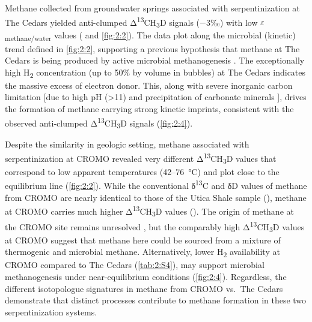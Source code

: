 Methane collected from groundwater springs associated with
serpentinization at The Cedars yielded anti-clumped
Δ\textsuperscript{13}CH\textsubscript{3}D signals ($-$3‰) with low
$\varepsilon$\textsubscript{methane/water} values ( and \ref{fig:2:2}). The data plot
along the microbial (kinetic) trend defined in \autoref{fig:2:2}, supporting a
previous hypothesis that methane at The Cedars is being produced by
active microbial methanogenesis \parencite{Morrill++_2013_GCA}. The exceptionally high
H\textsubscript{2} concentration (up to 50\% by volume in bubbles) at The Cedars indicates the
massive excess of electron donor. This, along with severe inorganic
carbon limitation {[}due to high pH (\textgreater{}11) and precipitation
of carbonate minerals \parencite{Morrill++_2013_GCA}{]}, drives the formation of methane
carrying strong kinetic imprints, consistent with the observed
anti-clumped Δ\textsuperscript{13}CH\textsubscript{3}D signals (\autoref{fig:2:4}).








Despite the similarity in geologic setting, methane associated with
serpentinization at CROMO \parencite{Cardace++_2013_SD} revealed very different
Δ\textsuperscript{13}CH\textsubscript{3}D values that correspond to
low apparent temperatures (42--76~°C) and plot close to the equilibrium
line (\autoref{fig:2:2}). While the conventional δ\textsuperscript{13}C and δD
values of methane from CROMO are nearly identical to those of the Utica
Shale sample (), methane at CROMO carries much higher
Δ\textsuperscript{13}CH\textsubscript{3}D values (). The origin
of methane at the CROMO site remains unresolved \parencite{Cardace++_2013_SD}, but the
comparably high Δ\textsuperscript{13}CH\textsubscript{3}D values at
CROMO suggest that methane here could be sourced from a mixture of
thermogenic and microbial methane. Alternatively, lower
H\textsubscript{2} availability at CROMO compared to The Cedars (\autoref{tab:2:S4}), may support microbial methanogenesis under near-equilibrium
conditions (\autoref{fig:2:4}). Regardless, the different isotopologue signatures
in methane from CROMO vs.\ The Cedars demonstrate that distinct processes
contribute to methane formation in these two serpentinization systems.

